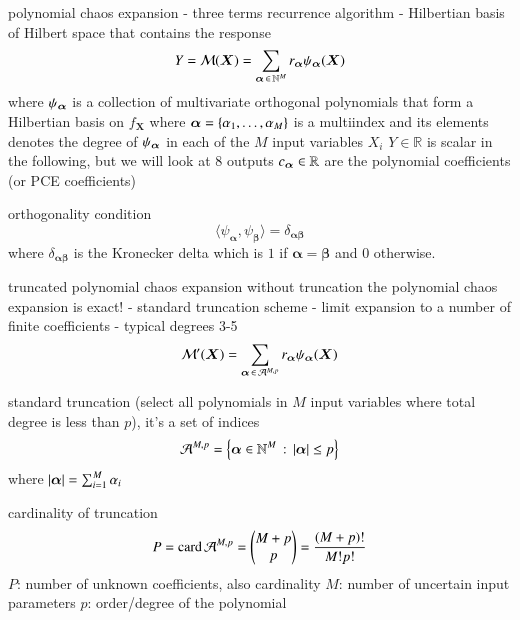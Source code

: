 polynomial chaos expansion
- three terms recurrence algorithm \cite{feinberg_chaospy_2015}
- Hilbertian basis of Hilbert space that contains the response \cite{sudret_global_2008}
\begin{equation}
    Y = \mathcal{M} ( \bm X ) = \sum_{{\bm{\alpha}} \,\in\, \mathbb{N}^M} r_{{\bm{\alpha}}} \psi_{{\bm{\alpha}}} (\bm X)
\end{equation}
where $\psi_{\bm{\alpha}}$ is a collection of multivariate orthogonal polynomials that form a Hilbertian basis on $f_{\bm X}$
where ${\bm{\alpha}} = \{\alpha_1,\dots,\alpha_M\}$ is a multiindex and its elements
denotes the degree of $\psi_{\bm{\alpha}}$ in each of the $M$ input variables $X_i$
$Y\in\mathbb{R}$ is scalar in the following, but we will look at 8 outputs
$c_{\bm{\alpha}} \in \mathbb{R}$ are the polynomial coefficients (or PCE coefficients)

orthogonality condition
\begin{equation}
    \langle \psi_{\bm\alpha}, \psi_{\bm\beta} \rangle = \delta_{\bm{\alpha\beta}}
\end{equation}
where $\delta_{\bm{\alpha\beta}}$ is the Kronecker delta which is $1$ if $\bm\alpha=\bm\beta$ and $0$ otherwise.

truncated polynomial chaos expansion
without truncation the polynomial chaos expansion is exact! \cite{fajraoui_optimal_2017}
- standard truncation scheme \cite{gratiet_metamodel-based_2015,sudret_global_2008}
- limit expansion to a number of finite coefficients
- typical degrees 3-5 \cite{gratiet_metamodel-based_2015}
\begin{equation}
    \mathcal{M}'(\bm X) = \sum_{{\bm{\alpha}} \,\in\, \mathcal{A}^{M,p}} r_{\bm{\alpha}} \psi_{\bm{\alpha}}(\bm X)
\end{equation}

standard truncation (select all polynomials in $M$ input variables where total degree is less than $p$), it's a set of indices
\begin{equation}
    \mathcal{A}^{M,p} = \left\{{\bm{\alpha}} \in \mathbb{N}^M \,:\, \left|{\bm{\alpha}}\right| \leq p\right\}
\end{equation}
where $\left|{\bm{\alpha}}\right| = \sum_{i=1}^M \alpha_i$

cardinality of truncation
\begin{equation}
    P = \text{card}\, \mathcal{A}^{M,p} = \left(\begin{matrix}
        M+p \\
        p
    \end{matrix}\right) = \frac{(M+p)!}{M!p!}
\end{equation}
$P$: number of unknown coefficients, also cardinality
$M$: number of uncertain input parameters
$p$: order/degree of the polynomial

